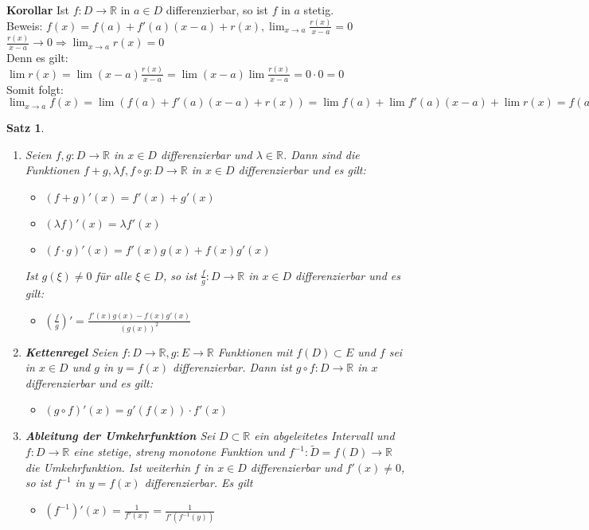 \documentclass[ngerman,titlepage,twoside, parskip=half*]{scrreprt}
\newcommand*{\R}{\mathbb{R}}
\theoremstyle{break}
\newtheorem{theorem}{Satz}[section]
\theoremstyle{nonumberbreak}
\begin{document}
\textbf{Korollar} Ist $f\colon D\rightarrow\R$ in $a\in D$ differenzierbar, so ist $f$ in $a$ stetig.\\
Beweis: $f(x)=f(a)+f'(a)(x-a)+r(x), \lim_{x\rightarrow a}\frac{r(x)}{x-a}=0$\\
$\frac{r(x)}{x-a}\rightarrow 0 \Rightarrow \lim_{x\rightarrow a}r(x)=0$\\
Denn es gilt: $\lim r(x)=\lim (x-a)\frac{r(x)}{x-a}=\lim (x-a)\lim\frac{r(x)}{x-a}=0\cdot 0=0$\\
Somit folgt: $\lim_{x\rightarrow a}f(x)=\lim(f(a)+f'(a)(x-a)+r(x))=\lim f(a)+\lim f'(a)(x-a)+\lim r(x)
=f(a)+0+0=f(a)$

\begin{theorem}
\begin{enumerate}[(1)]
  \item Seien $f,g\colon D\rightarrow \R$ in $x\in D$ differenzierbar und $\lambda\in\R$. Dann sind die 
    Funktionen $f+g, \lambda f, f\circ g\colon D\rightarrow\R$ in $x\in D$ differenzierbar und es gilt:
    \begin{itemize}
      \item $(f+g)'(x)=f'(x)+g'(x)$
      \item $(\lambda f)'(x)=\lambda f'(x)$
      \item $(f\cdot g)'(x)=f'(x)g(x)+f(x)g'(x)$
    \end{itemize}
    Ist $g(\xi)\neq 0$ für alle $\xi\in D$, so ist $\frac{f}{g}\colon D\rightarrow\R$ in $x\in D$ differenzierbar 
    und es gilt:
    \begin{itemize}
      \item $(\frac{f}{g})'=\frac{f'(x)g(x)-f(x)g'(x)}{(g(x))^2}$
    \end{itemize}
  \item \textbf{Kettenregel} Seien $f\colon D\rightarrow\R, g\colon E\rightarrow\R$ Funktionen mit $f(D)\subset E$ und
    $f$ sei in $x\in D$ und $g$ in $y=f(x)$ differenzierbar. Dann ist $g\circ f\colon D\rightarrow\R$ in $x$
    differenzierbar und es gilt:
    \begin{itemize}
      \item $(g\circ f)'(x)=g'(f(x))\cdot f'(x)$
    \end{itemize}
  \item \textbf{Ableitung der Umkehrfunktion} Sei $D\subset \R$ ein abgeleitetes Intervall und 
    $f\colon D\rightarrow\R$ eine stetige, streng monotone Funktion und $f^{-1}\colon\tilde{D}=f(D)\rightarrow\R$
    die Umkehrfunktion. Ist weiterhin $f$ in $x\in D$ differenzierbar und $f'(x)\neq 0$, so ist
    $f^{-1}$ in $y=f(x)$ differenzierbar. Es gilt
    \begin{itemize}
      \item $(f^{-1})'(x)=\frac{1}{f'(x)}=\frac{1}{f'(f^{-1}(y))}$
    \end{itemize}
\end{enumerate}
\end{theorem}
\end{document}
